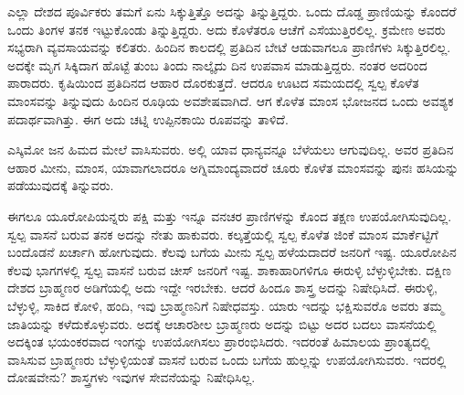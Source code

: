 ಎಲ್ಲಾ ದೇಶದ ಪೂರ್ವಿಕರು ತಮಗೆ ಏನು ಸಿಕ್ಕುತ್ತಿತ್ತೊ ಅದನ್ನು ತಿನ್ನುತ್ತಿದ್ದರು. ಒಂದು ದೊಡ್ಡ ಪ್ರಾಣಿಯನ್ನು ಕೊಂದರೆ ಒಂದು ತಿಂಗಳ ತನಕ ಇಟ್ಟುಕೊಂಡು ತಿನ್ನುತ್ತಿದ್ದರು. ಅದು ಕೊಳೆತರೂ ಆಚೆಗೆ ಎಸೆಯುತ್ತಿರಲಿಲ್ಲ. ಕ್ರಮೇಣ ಅವರು ಸಭ್ಯರಾಗಿ ವ್ಯವಸಾಯವನ್ನು ಕಲಿತರು. ಹಿಂದಿನ ಕಾಲದಲ್ಲಿ ಪ್ರತಿದಿನ ಬೇಟೆ ಆಡುವಾಗಲೂ ಪ್ರಾಣಿಗಳು ಸಿಕ್ಕುತ್ತಿರಲಿಲ್ಲ. ಅದಕ್ಕೇ ಮೃಗ ಸಿಕ್ಕಿದಾಗ ಹೊಟ್ಟೆ ತುಂಬ ತಿಂದು ನಾಲ್ಕೈದು ದಿನ ಉಪವಾಸ ಮಾಡುತ್ತಿದ್ದರು. ನಂತರ ಅದರಿಂದ ಪಾರಾದರು. ಕೃಷಿಯಿಂದ ಪ್ರತಿದಿನದ ಆಹಾರ ದೊರಕುತ್ತದೆ. ಆದರೂ ಊಟದ ಸಮಯದಲ್ಲಿ ಸ್ವಲ್ಪ ಕೊಳೆತ ಮಾಂಸವನ್ನು ತಿನ್ನುವುದು ಹಿಂದಿನ ರೂಢಿಯ ಅವಶೇಷವಾಗಿದೆ. ಆಗ ಕೊಳೆತ ಮಾಂಸ ಭೋಜನದ ಒಂದು ಅವಶ್ಯಕ ಪದಾರ್ಥವಾಗಿತ್ತು. ಈಗ ಅದು ಚಟ್ನಿ ಉಪ್ಪಿನಕಾಯಿ ರೂಪವನ್ನು ತಾಳಿದೆ.

ಎಸ್ಕಿಮೋ ಜನ ಹಿಮದ ಮೇಲೆ ವಾಸಿಸುವರು. ಅಲ್ಲಿ ಯಾವ ಧಾನ್ಯವನ್ನೂ ಬೆಳೆಯಲು ಆಗುವುದಿಲ್ಲ. ಅವರ ಪ್ರತಿದಿನ ಆಹಾರ ಮೀನು, ಮಾಂಸ, ಯಾವಾಗಲಾದರೂ ಅಗ್ನಿಮಾಂದ್ಯವಾದರೆ ಚೂರು ಕೊಳೆತ ಮಾಂಸವನ್ನು ಪುನಃ ಹಸಿಯನ್ನು ಪಡೆಯುವುದಕ್ಕೆ ತಿನ್ನುವರು.

ಈಗಲೂ ಯೂರೋಪಿಯನ್ನರು ಪಕ್ಷಿ ಮತ್ತು ಇನ್ನೂ ವನಚರ ಪ್ರಾಣಿಗಳನ್ನು ಕೊಂದ ತಕ್ಷಣ ಉಪಯೋಗಿಸುವುದಿಲ್ಲ. ಸ್ವಲ್ಪ ವಾಸನೆ ಬರುವ ತನಕ ಅದನ್ನು ನೇತು ಹಾಕುವರು. ಕಲ್ಕತ್ತೆಯಲ್ಲಿ ಸ್ವಲ್ಪ ಕೊಳೆತ ಜಿಂಕೆ ಮಾಂಸ ಮಾರ್ಕೆಟ್ಟಿಗೆ ಬಂದೊಡನೆ ಖರ್ಚಾಗಿ ಹೋಗುವುದು. ಕೆಲವು ಬಗೆಯ ಮೀನು ಸ್ವಲ್ಪ ಹಳೆಯದಾದರೆ ಜನರಿಗೆ ಇಷ್ಟ. ಯೂರೋಪಿನ ಕೆಲವು ಭಾಗಗಳಲ್ಲಿ ಸ್ವಲ್ಪ ವಾಸನೆ ಬರುವ ಚೀಸ್​ ಜನರಿಗೆ ಇಷ್ಟ. ಶಾಕಾಹಾರಿಗಳಿಗೂ ಈರುಳ್ಳಿ ಬೆಳ್ಳುಳ್ಳಿಬೇಕು. ದಕ್ಷಿಣ ದೇಶದ ಬ್ರಾಹ್ಮಣರ ಅಡಿಗೆಯಲ್ಲಿ ಅದು ಇದ್ದೇ ಇರಬೇಕು. ಆದರೆ ಹಿಂದೂ ಶಾಸ್ತ್ರ ಅದನ್ನು ನಿಷೇಧಿಸಿದೆ. ಈರುಳ್ಳಿ, ಬೆಳ್ಳುಳ್ಳಿ, ಸಾಕಿದ ಕೋಳಿ, ಹಂದಿ, ಇವು ಬ್ರಾಹ್ಮಣನಿಗೆ ನಿಷೇಧವಸ್ತು. ಯಾರು ಇದನ್ನು ಭಕ್ಷಿಸುವರೊ ಅವರು ತಮ್ಮ ಜಾತಿಯನ್ನು ಕಳೆದುಕೊಳ್ಳುವರು. ಅದಕ್ಕೆ ಆಚಾರಶೀಲ ಬ್ರಾಹ್ಮಣರು ಅದನ್ನು ಬಿಟ್ಟು ಅದರ ಬದಲು ವಾಸನೆಯಲ್ಲಿ ಅದಕ್ಕಿಂತ ಭಯಂಕರವಾದ ಇಂಗನ್ನು ಉಪಯೋಗಿಸಲು ಪ್ರಾರಂಭಿಸಿದರು. ಇದರಂತೆ ಹಿಮಾಲಯ ಪ್ರಾಂತ್ಯದಲ್ಲಿ ವಾಸಿಸುವ ಬ್ರಾಹ್ಮಣರು ಬೆಳ್ಳುಳ್ಳಿಯಂತೆ ವಾಸನೆ ಬರುವ ಒಂದು ಬಗೆಯ ಹುಲ್ಲನ್ನು ಉಪಯೋಗಿಸುವರು. ಇದರಲ್ಲಿ ದೋಷವೇನು? ಶಾಸ್ತ್ರಗಳು ಇವುಗಳ ಸೇವನೆಯನ್ನು ನಿಷೇಧಿಸಿಲ್ಲ.

